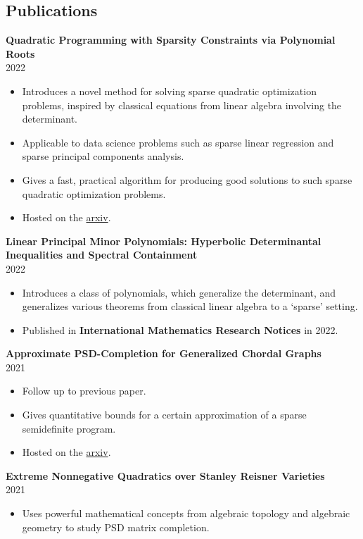 \documentclass[margin]{res}
\begin{document}
\begin{resume}
\section{Publications}
{\bf  Quadratic Programming with Sparsity Constraints via Polynomial Roots } \\ 2022
\begin{itemize} \itemsep -2pt %
\item Introduces a novel method for solving sparse quadratic optimization problems, inspired by classical equations from linear algebra involving the determinant.
\item Applicable to data science problems such as sparse linear regression and sparse principal components analysis.
\item Gives a fast, practical algorithm for producing good solutions to such sparse quadratic optimization problems.
\item Hosted on the \href{https://arxiv.org/abs/2208.11143}{arxiv}.
\end{itemize}
{\bf  Linear Principal Minor Polynomials: Hyperbolic Determinantal Inequalities and Spectral Containment } \\ 2022
\begin{itemize} \itemsep -2pt %
\item Introduces a class of polynomials, which generalize the determinant, and generalizes various theorems from classical linear algebra to a `sparse' setting.
\item Published in \textbf{International Mathematics Research Notices} in 2022.
\end{itemize}
{\bf  Approximate PSD-Completion for Generalized Chordal Graphs  } \\ 2021
\begin{itemize} \itemsep -2pt %
\item Follow up to previous paper.
\item Gives quantitative bounds for a certain approximation of a sparse semidefinite program.
\item Hosted on the \href{https://arxiv.org/abs/2107.11436}{arxiv}.
\end{itemize}
{\bf    Extreme Nonnegative Quadratics over Stanley Reisner Varieties} \\ 2021
\begin{itemize} \itemsep -2pt %
\item Uses powerful mathematical concepts from algebraic topology and algebraic geometry to study PSD matrix completion.

\end{itemize}
\end{resume}
\end{document}
